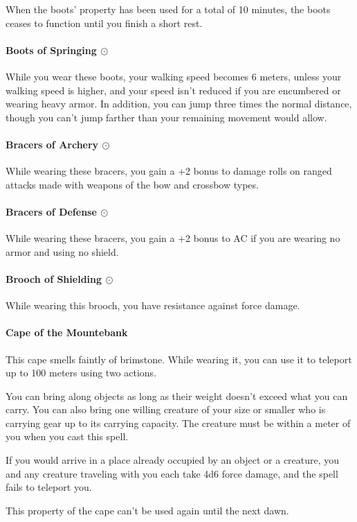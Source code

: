         When the boots' property has been used for a total of 10 minutes, the boots ceases to function until you finish a short rest.
    \paragraph{Boots of Springing $\odot$}
        While you wear these boots, your walking speed becomes 6 meters, unless your walking speed is higher, and your speed isn't reduced if you are encumbered or wearing heavy armor.
        In addition, you can jump three times the normal distance, though you can't jump farther than your remaining movement would allow.
    \paragraph{Bracers of Archery $\odot$}
        While wearing these bracers, you gain a +2 bonus to damage rolls on ranged attacks made with weapons of the bow and crossbow types.
    \paragraph{Bracers of Defense $\odot$}
        While wearing these bracers, you gain a +2 bonus to AC if you are wearing no armor and using no shield.
    \paragraph{Brooch of Shielding $\odot$}
        While wearing this brooch, you have resistance against force damage.
    \paragraph{Cape of the Mountebank}
        This cape smells faintly of brimstone.
        While wearing it, you can use it to teleport up to 100 meters using two actions.

        You can bring along objects as long as their weight doesn't exceed what you can carry.
        You can also bring one willing creature of your size or smaller who is carrying gear up to its carrying capacity.
        The creature must be within a meter of you when you cast this spell.

        If you would arrive in a place already occupied by an object or a creature, you and any creature traveling with you each take 4d6 force damage, and the spell fails to teleport you.

        This property of the cape can't be used again until the next dawn.

